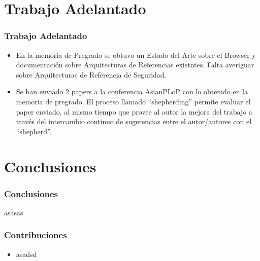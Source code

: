 \documentclass[serif,9pt]{beamer}
\begin{document}
\section{Trabajo Adelantado}
\begin{frame}
	\frametitle{Trabajo Adelantado}
	\begin{itemize}
		\item En la memoria de Pregrado se obtuvo un Estado del Arte sobre el Browser y documentación sobre Arquitecturas de Referencias existntes. Falta averiguar sobre Arquitecturas de Referencia de Seguridad.
		\item Se han enviado 2 papers a la conferencia AsianPLoP con lo obtenido en la memoria de pregrado. El proceso llamado “shepherding” permite evaluar el paper enviado, al mismo tiempo que provee al autor la mejora del trabajo a través del intercambio continuo de sugerencias entre el autor/autores con el “shepherd”.
	\end{itemize}
\end{frame}


\section{Conclusiones}
\begin{frame}
	\frametitle{Conclusiones}
	asasas
\end{frame}

\begin{frame}
	\frametitle{Contribuciones}	
	\begin{itemize}
	\item asadsd
	\end{itemize}
\end{frame}
\end{document}

